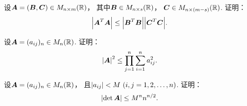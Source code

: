 \begin{example}
设\(\boldsymbol{A} = (\boldsymbol{B},\boldsymbol{C}) \in M_{n \times m}(\mathbb{R})\)，
其中\(\boldsymbol{B} \in M_{n \times s}(\mathbb{R})\)，
\(\boldsymbol{C} \in M_{n \times (m-s)}(\mathbb{R})\).
证明：\begin{equation}
\abs{\boldsymbol{A}^T \boldsymbol{A}} \leq \abs{\boldsymbol{B}^T \boldsymbol{B}} \abs{\boldsymbol{C}^T \boldsymbol{C}}.
\end{equation}
\end{example}

\begin{example}
设\(\boldsymbol{A} = (a_{ij})_n \in M_n(\mathbb{R})\).
证明：\begin{equation}\label{equation:线性方程组.Hadamard不等式}
	\abs{\boldsymbol{A}}^2 \leq \prod_{j=1}^n \sum_{i=1}^n a_{ij}^2.
\end{equation}
\end{example}

\begin{example}
设\(\boldsymbol{A} = (a_{ij})_n \in M_n(\mathbb{R})\)，
且\(\abs{a_{ij}} < M\ (i,j=1,2,\dotsc,n)\).
证明：\begin{equation}
	\abs{\det\boldsymbol{A}} \leq M^n n^{n/2}.
\end{equation}
\end{example}
